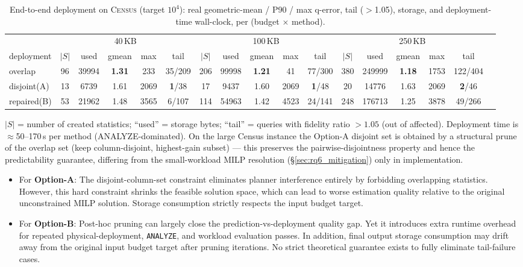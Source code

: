 \documentclass[sigconf, nonacm]{acmart}
\begin{document}
\begin{table}[t]
\caption{End-to-end deployment on \textsc{Census} (target $10^4$): real
geometric-mean / P90 / max q-error, tail ($>$1.05), storage, and
deployment-time wall-clock, per (budget $\times$ method).}
\label{tab:rq6}
\small
\begin{tabular}{l@{\hskip 5pt}c@{\hskip 5pt}c@{\hskip 5pt}c@{\hskip 5pt}c@{\hskip 5pt}c@{\hskip 5pt}c@{\hskip 5pt}c@{\hskip 6pt}c@{\hskip 5pt}c@{\hskip 5pt}c@{\hskip 5pt}c@{\hskip 5pt}c@{\hskip 5pt}c@{\hskip 5pt}c@{\hskip 5pt}c@{\hskip 5pt}c}
\toprule
 & \multicolumn{5}{c}{40\,KB} & \multicolumn{5}{c}{100\,KB} & \multicolumn{5}{c}{250\,KB}\\
\cmidrule(lr){2-6}\cmidrule(lr){7-11}\cmidrule(lr){12-16}
deployment & $|S|$ & used & gmean & max & tail &
$|S|$ & used & gmean & max & tail &
$|S|$ & used & gmean & max & tail\\
\midrule
overlap     & 96  & 39994 & \textbf{1.31} & 233  & 35/209 &
206 & 99998 & \textbf{1.21} & 41 & 77/300 &
380 & 249999 & \textbf{1.18} & 1753 & 122/404\\
disjoint(A) & 13  & 6739  & 1.61 & 2069 & \textbf{1}/38 &
17 & 9437  & 1.60 & 2069 & \textbf{1}/48 &
20 & 14776 & 1.63 & 2069 & \textbf{2}/46\\
repaired(B) & 53  & 21962 & 1.48 & 3565 & 6/107 &
114 & 54963 & 1.42 & 4523 & 24/141 &
248 & 176713 & 1.25 & 3878 & 49/266\\
\bottomrule
\end{tabular}

{\footnotesize $|S|$ = number of created statistics; ``used'' = storage bytes;
``tail'' = queries with fidelity ratio $>1.05$ (out of affected). Deployment
time is $\approx$50--170\,s per method (ANALYZE-dominated). On the large
Census instance the Option-A disjoint set is obtained by a structural prune of
the overlap set (keep column-disjoint, highest-gain subset) --- this preserves
the pairwise-disjointness property and hence the predictability guarantee,
differing from the small-workload MILP resolution (\S\ref{sec:rq6_mitigation})
only in implementation.}
\end{table}

\begin{itemize}
    \item For \textbf{Option-A}: The disjoint-column-set constraint eliminates planner interference entirely by forbidding overlapping statistics. However, this hard constraint shrinks the feasible solution space, which can lead to worse estimation quality relative to the original unconstrained MILP solution. Storage consumption strictly respects the input budget target.
    \item For \textbf{Option-B}: Post-hoc pruning can largely close the prediction-vs-deployment quality gap. Yet it introduces extra runtime overhead for repeated physical-deployment, \texttt{ANALYZE}, and workload evaluation passes. In addition, final output storage consumption may drift away from the original input budget target after pruning iterations. No strict theoretical guarantee exists to fully eliminate tail-failure cases.
\end{itemize}
\end{document}
